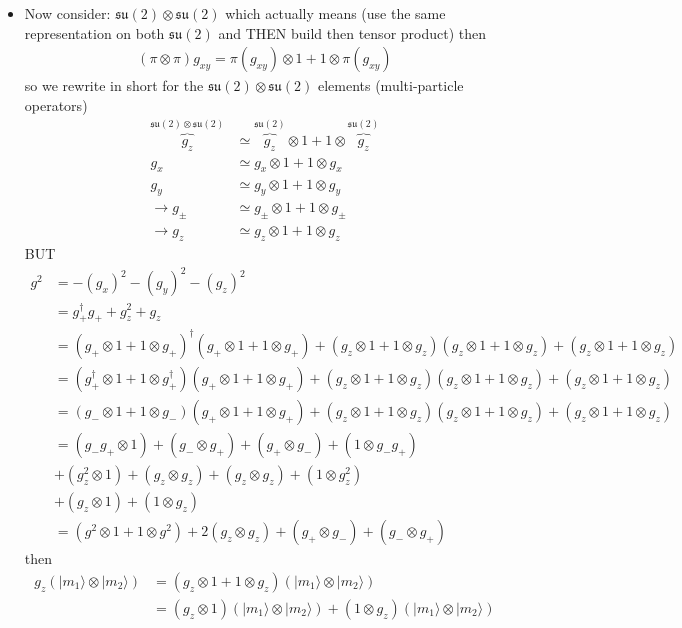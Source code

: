 \documentclass[../main.tex]{subfiles}
\begin{document}
\begin{itemize}
\item Now consider: $\mathfrak{su}(2)\otimes\mathfrak{su}(2)$ which actually means (use the same representation on both $\mathfrak{su}(2)$ and THEN build then tensor product) then
\begin{align}
(\pi\otimes\pi)g_{xy}=\pi(g_{xy})\otimes1+1\otimes\pi(g_{xy})
\end{align}
so we rewrite in short for the $\mathfrak{su}(2)\otimes\mathfrak{su}(2)$ elements (multi-particle operators)
\begin{align}
\overbrace{g_{z}}^{\mathfrak{su}(2)\otimes\mathfrak{su}(2)}&\simeq \overbrace{g_{z}}^{\mathfrak{su}(2)}\otimes1+1\otimes \overbrace{g_{z}}^{\mathfrak{su}(2)}\\
g_{x}&\simeq g_{x}\otimes1+1\otimes g_{x}\\
g_{y}&\simeq g_{y}\otimes1+1\otimes g_{y}\\
\rightarrow g_{\pm}&\simeq g_{\pm}\otimes1+1\otimes g_{\pm}\\
\rightarrow g_{z}&\simeq g_{z}\otimes1+1\otimes g_{z}
\end{align}
BUT
\begin{align}
g^2
&=-(g_x)^2-(g_y)^2-(g_z)^2\\
&=g_+^\dagger g_+ +g_z^2+g_z\\
&=(g_+\otimes 1+1\otimes g_+)^\dagger(g_+\otimes 1+1\otimes g_+)
+(g_z\otimes 1+1\otimes g_z)(g_z\otimes 1+1\otimes g_z)+(g_z\otimes 1+1\otimes g_z)\\
&=(g_+^\dagger\otimes 1+1\otimes g_+^\dagger)(g_+\otimes 1+1\otimes g_+)
+(g_z\otimes 1+1\otimes g_z)(g_z\otimes 1+1\otimes g_z)+(g_z\otimes 1+1\otimes g_z)\\
&=(g_-\otimes 1+1\otimes g_-)(g_+\otimes 1+1\otimes g_+)
+(g_z\otimes 1+1\otimes g_z)(g_z\otimes 1+1\otimes g_z)+(g_z\otimes 1+1\otimes g_z)\\
&=(g_-g_+\otimes1)+(g_-\otimes g_+)+(g_+\otimes g_-)+(1\otimes g_-g_+)\\
&+(g_z^2\otimes1)+(g_z\otimes g_z)+(g_z\otimes g_z)+(1\otimes g_z^2)\\
&+(g_z\otimes 1)+(1\otimes g_z)\\
&=(g^2\otimes1+1\otimes g^2)+2(g_z\otimes g_z)+(g_+\otimes g_-)+(g_-\otimes g_+)
\end{align}
then
\begin{align}
g_z(|m_1\rangle\otimes|m_2\rangle)
&=(g_{z}\otimes1+1\otimes g_{z})(|m_1\rangle\otimes|m_2\rangle)\\
&=(g_{z}\otimes1)(|m_1\rangle\otimes|m_2\rangle)+(1\otimes g_{z})(|m_1\rangle\otimes|m_2\rangle)\\

\end{align}
\end{itemize}
\end{document}
